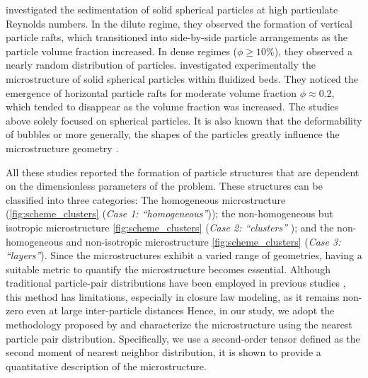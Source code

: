 \citet{shajahan2023inertial} investigated the sedimentation of solid spherical particles at high particulate Reynolds numbers.
In the dilute regime, they observed the formation of vertical particle rafts, which transitioned into side-by-side particle arrangements as the particle volume fraction increased. In dense regimes ($\phi \geq 10 \%$), they observed a nearly random distribution of particles. %
\citet{almeras2021statistics} investigated experimentally the microstructure of solid spherical particles within fluidized beds. They noticed the emergence of horizontal particle rafts for moderate volume fraction $\phi \approx 0.2$, which tended to disappear as the volume fraction was increased.  %
The studies above solely focused on spherical particles.
It is also known that the deformability of bubbles or more generally, the shapes of the particles greatly influence the microstructure geometry \citep{bunner2003effect,seyed2021sedimentation}.

All these studies reported the formation of particle structures that are dependent on the dimensionless parameters of the problem.
These structures can be classified into three categories: The homogeneous microstructure (\ref{fig:scheme_clusters} (\textit{Case 1: ``homogeneous''})); the non-homogeneous but isotropic microstructure \ref{fig:scheme_clusters} (\textit{Case 2: ``clusters'' }); and the non-homogeneous and non-isotropic microstructure \ref{fig:scheme_clusters} (\textit{Case 3: ``layers''}).
Since the microstructures exhibit a varied range of geometries, having a suitable metric to quantify the microstructure becomes essential. 
Although traditional particle-pair distributions have been employed in previous studies \citep{yin2007,cartellier2009induced, seyed2021sedimentation}, this method has limitations, especially in closure law modeling, as it remains non-zero even at large inter-particle distances 
Hence, in our study, we adopt the methodology proposed by \citep{zhang2023evolution} and characterize the microstructure using the nearest particle pair distribution.
Specifically, we use a second-order tensor defined as the second moment of nearest neighbor distribution, it is shown to provide a quantitative description of the microstructure.

